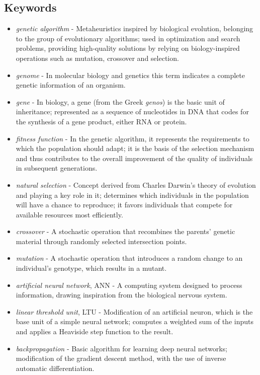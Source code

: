 \documentclass[a4paper,12pt]{article}
\numberwithin{figure}{section}
\begin{document}
    \subsection{Keywords}

    \begin{itemize}
        \item \textit{genetic algorithm} - Metaheuristics inspired by biological evolution, belonging to the group of evolutionary algorithms; used in optimization and search problems, providing high-quality solutions by relying on biology-inspired operations such as mutation, crossover and selection\cite{GeneticAlgorithmsMitchell1996}.
        \item \textit{genome} - In molecular biology and genetics this term indicates a complete genetic information of an organism\cite{WhatIsGenomicMedicine2019}.
        \item \textit{gene} - In biology, a gene (from the Greek \textit{genos}) is the basic unit of inheritance; represented as a sequence of nucleotides in DNA that codes for the synthesis of a gene product, either RNA or protein\cite{GeneWiki}.
        \item \textit{fitness function} - In the genetic algorithm, it represents the requirements to which the population should adapt; it is the basis of the selection mechanism and thus contributes to the overall improvement of the quality of individuals in subsequent generations\cite{IntroductionToEvolutionaryComputing2015}.
        \item \textit{natural selection} - Concept derived from Charles Darwin's theory of evolution and playing a key role in it; determines which individuals in the population will have a chance to reproduce; it favors individuals that compete for available resources most efficiently\cite{IntroductionToEvolutionaryComputing2015}.
        \item \textit{crossover} - A stochastic operation that recombines the parents' genetic material through randomly selected intersection points\cite{IntroductionToEvolutionaryComputing2015}.
        \item \textit{mutation} - A stochastic operation that introduces a random change to an individual's genotype, which results in a mutant\cite{IntroductionToEvolutionaryComputing2015}.
        \item \textit{artificial neural network}, ANN - A computing system designed to process information, drawing inspiration from the biological nervous system\cite{LeksykonSieciNeuronowych2015}.
        \item \textit{linear threshold unit}, LTU - Modification of an artificial neuron, which is the base unit of a simple neural network; computes a weighted sum of the inputs and applies a Heaviside step function to the result\cite{UczenieMaszynowe2018}.
        \item \textit{backpropagation} - Basic algorithm for learning deep neural networks; modification of the gradient descent method, with the use of inverse automatic differentiation\cite{UczenieMaszynowe2018}.
    \end{itemize}
\end{document}
